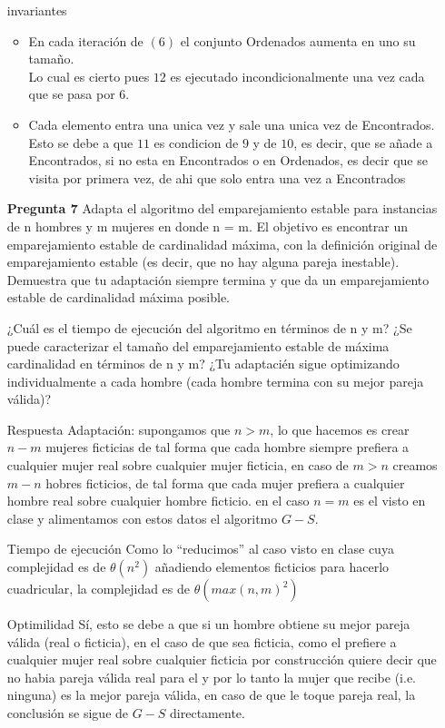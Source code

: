 \documentclass[12pt]{article}
\begin{document}
\begin{itemize}
\item[invariantes]
  \begin{itemize}
 \item En cada iteración de $(6)$ el conjunto Ordenados aumenta en uno su tamaño.\\
   Lo cual es cierto pues $12$ es ejecutado incondicionalmente una vez cada que se pasa por $6$.
   \item Cada elemento entra una unica vez y sale una unica vez de Encontrados.\\
     Esto se debe a que $11$ es condicion de $9$ y de $10$, es decir, que se añade a Encontrados, si no esta en Encontrados o en Ordenados, es decir que se visita por primera vez, de ahi que solo entra una vez a Encontrados
   \end{itemize}


\item[\bf{Pregunta 7}] Adapta el algoritmo del emparejamiento estable para instancias de n hombres y m mujeres en donde n = m. El objetivo es encontrar un emparejamiento estable de cardinalidad máxima, con la definición original de emparejamiento estable (es decir, que no hay alguna pareja inestable). Demuestra que tu adaptación siempre termina y que da un emparejamiento estable de cardinalidad máxima posible.

¿Cuál es el tiempo de ejecución del algoritmo en términos de n y m?
¿Se puede caracterizar el tamaño del emparejamiento estable de máxima
cardinalidad en términos de n y m?
¿Tu adaptacién sigue optimizando individualmente a cada hombre (cada hombre termina con su mejor pareja válida)?

\item[Respuesta] Adaptación: supongamos que $n > m$, lo que hacemos es crear $n-m$ mujeres ficticias de tal forma que cada hombre siempre prefiera a cualquier mujer real sobre cualquier mujer ficticia, en caso de $m > n$ creamos $m-n$ hobres ficticios, de tal forma que cada mujer prefiera a cualquier hombre real sobre cualquier hombre ficticio. en el caso $n = m$ es el visto en clase y alimentamos con estos datos el algoritmo $G-S$.
\item[Tiempo de ejecución] Como lo ``reducimos'' al caso visto en clase cuya complejidad es de $\theta(n^2)$ añadiendo elementos ficticios para hacerlo cuadricular, la complejidad es de  $\theta(max(n,m)^2)$

\item[Optimilidad] Sí, esto se debe a que si un hombre obtiene su mejor pareja válida (real o ficticia), en el caso de que sea ficticia, como el prefiere a cualquier mujer real sobre cualquier ficticia por construcción quiere decir que no habia pareja válida real para el y por lo tanto la mujer que recibe (i.e. ninguna) es la mejor pareja válida, en caso de que le toque pareja real, la conclusión se sigue de $G-S$ directamente.


\end{itemize}
\end{document}
